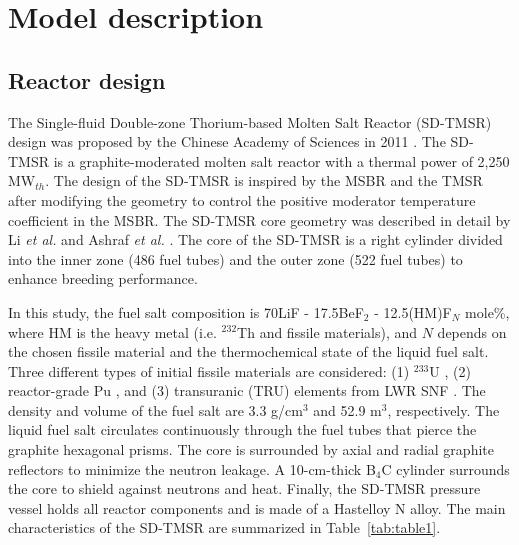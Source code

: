 \section{Model description} \label{Model-description}
\subsection{Reactor design}

The Single-fluid Double-zone Thorium-based Molten Salt Reactor (SD-TMSR) design was proposed by the Chinese Academy of Sciences in 2011 
\cite{li_optimization_2018,jiang2012advanced,li2015analysis,li2017model}. The 
\gls{SD-TMSR} is a graphite-moderated molten salt reactor with a thermal power 
of 2,250 MW$_{th}$. The design of the \gls{SD-TMSR} is inspired by the 
\gls{MSBR} \cite{robertson_conceptual_1971} and the \gls{TMSR} 
\cite{nuttin2005potential} after modifying the geometry to control the 
positive moderator temperature coefficient in the MSBR. The \gls{SD-TMSR} core 
geometry was described in detail by Li \emph{et al.} and Ashraf \emph{et al.}
\cite{li_optimization_2018,ashraf2019whole_core}. The core of the  
\gls{SD-TMSR} is a right cylinder divided into the inner zone (486 fuel tubes) 
and the outer zone (522 fuel tubes) to enhance breeding performance.

In this study, the fuel salt composition is 70LiF - 17.5BeF$_2$ - 
12.5(HM)F$_N$ mole\%, where HM is the heavy metal (i.e. $^{232}$Th and fissile 
materials), and $N$ depends on the chosen fissile material and the  
thermochemical state of the liquid fuel salt. Three different types of initial 
fissile materials are considered: (1) $^{233}$U \cite{ashraf2019whole_core}, 
(2) reactor-grade Pu \cite{marka1993explosive}, and (3) transuranic (TRU) 
elements from \gls{LWR} \gls{SNF} \cite{de2000scenarios}.
The density and volume of the fuel salt are 3.3 g/cm$^{3}$ and 52.9 m$^3$, 
respectively. The liquid fuel salt circulates continuously through the fuel 
tubes that pierce the graphite hexagonal prisms. The core is surrounded by 
axial and radial graphite reflectors to minimize the neutron leakage.
A 10-cm-thick B$_4$C cylinder surrounds the core to shield against neutrons and heat.
Finally, the \gls{SD-TMSR} pressure vessel holds all reactor components and is made of 
a Hastelloy N alloy. The main characteristics of the \gls{SD-TMSR} are 
summarized in Table~\ref{tab:table1}.


